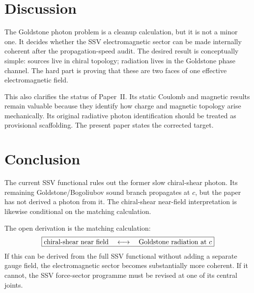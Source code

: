 \documentclass[11pt,a4paper]{article}
\begin{document}
\section{Discussion}
\label{sec:discussion}

The Goldstone photon problem is a cleanup calculation, but it is not a
minor one.  It decides whether the SSV electromagnetic sector can be made
internally coherent after the propagation-speed audit.  The desired result
is conceptually simple: sources live in chiral topology; radiation lives in
the Goldstone phase channel.  The hard part is proving that these are two
faces of one effective electromagnetic field.

This also clarifies the status of Paper~II.  Its static Coulomb and
magnetic results remain valuable because they identify how charge and
magnetic topology arise mechanically.  Its original radiative photon
identification should be treated as provisional scaffolding.  The present
paper states the corrected target.

\section{Conclusion}
\label{sec:conclusion}

The current SSV functional rules out the former slow chiral-shear photon.
Its remaining Goldstone/Bogoliubov sound branch propagates at $c$, but the
paper has not derived a photon from it.  The chiral-shear near-field
interpretation is likewise conditional on the matching calculation.

The open derivation is the matching calculation:
\[
    \boxed{
    \hbox{chiral-shear near field}
    \quad\longleftrightarrow\quad
    \hbox{Goldstone radiation at }c
    }
\]
If this can be derived from the full SSV functional without adding a
separate gauge field, the electromagnetic sector becomes substantially more
coherent.  If it cannot, the SSV force-sector programme must be revised at
one of its central joints.



\end{document}
